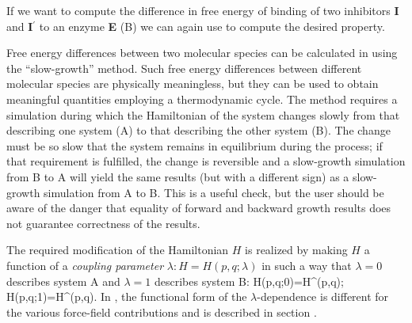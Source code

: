 If we want to compute the difference in free energy of binding of two
inhibitors {\bf I} and {\bf I$^{\prime}$} to an enzyme {\bf E} (B)
we can again use  to compute the desired property.

\newcommand{\sA}{^{\mathrm{A}}}
\newcommand{\sB}{^{\mathrm{B}}}
Free energy differences between two molecular species can
be calculated in {\gromacs} using the ``slow-growth'' method.
Such free energy differences between different molecular species are
physically meaningless, but they can be used to obtain meaningful
quantities employing a thermodynamic cycle.
The method requires a simulation during which the Hamiltonian of the
system changes slowly from that describing one system (A) to that
describing the other system (B). The change must be so slow that the
system remains in equilibrium during the process; if that requirement
is fulfilled, the change is reversible and a slow-growth simulation from B to A
will yield the same results (but with a different sign) as a slow-growth
simulation from A to B. This is a useful check, but the user should be
aware of the danger that equality of forward and backward growth results does
not guarantee correctness of the results.

The required modification of the Hamiltonian $H$ is realized by making
$H$ a function of a \textit{coupling parameter} $\lambda:
H=H(p,q;\lambda)$ in such a way that $\lambda=0$ describes system A
and $\lambda=1$ describes system B: 
\beq
  H(p,q;0)=H\sA (p,q);~~~~ H(p,q;1)=H\sB (p,q).
\eeq
In {\gromacs}, the functional form of the $\lambda$-dependence is
different for the various force-field contributions and is described
in section .

